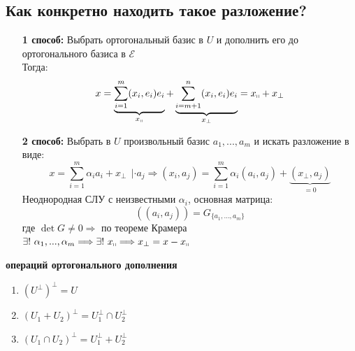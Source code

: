 \subsection*{Как конкретно находить такое разложение?}
\begin{itemize}
    \item[\textbf{1 способ:}] Выбрать ортогональный базис в $U$ и дополнить его до ортогонального базиса в $\mathcal{E}$\\
    Тогда:
    $$x = \underbrace{\sum \limits_{i=1}^m(x_i,e_i)e_i}_{x_\shortparallel}  + \underbrace{\sum \limits_{i=m+1}^n(x_i,e_i)e_i}_{x_\perp} = x_\shortparallel + x_\perp$$
    \item[\textbf{2 способ:}] Выбрать в $U$ произвольный базис $a_1,...,a_m$ и искать разложение в виде:
    $$x = \sum \limits_{i=1}^m \alpha_ia_i + x_\perp \ \ | \cdot a_j \Longrightarrow (x_i,a_j) = \sum \limits_{i=1}^m \alpha_i(a_i,a_j) + \underbrace{(x_\perp, a_j)}_{=0} $$
    Неоднородная СЛУ с неизвестными $\alpha_i$, основная матрица: 
    $$((a_i,a_j)) = G_{\{a_1,...,a_m\}}$$
    где $\det G \neq 0 \Longrightarrow$ по теореме Крамера $\exists ! \ \alpha_1,...,\alpha_m \Longrightarrow \exists ! \ x_\shortparallel \Longrightarrow x_\perp = x - x_\shortparallel$   
\end{itemize}
\begin{properties} \textbf{операций ортогонального дополнения} 
    \begin{enumerate}
        \item $(U^\perp)^\perp = U$
        \item $(U_1 + U_2)^\perp = U_1^\perp \cap U_2^\perp$
        \item $(U_1 \cap U_2)^\perp = U_1^\perp + U_2^\perp$
    \end{enumerate}
\end{properties}

